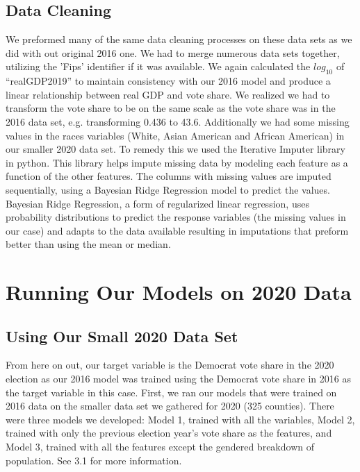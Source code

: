 \documentclass[letterpaper, twocolumn]{article}
\begin{document}
\subsection{Data Cleaning}

We preformed many of the same data cleaning processes on these data sets as we did with out original 2016 one. We had to merge numerous data sets together, utilizing the 'Fips' identifier if it was available. We again calculated the $log_{10}$ of “realGDP2019” to maintain consistency with our 2016 model and produce a linear relationship between real GDP and vote share. We realized we had to transform the vote share to be on the same scale as the vote share was in the 2016 data set, e.g. transforming 0.436 to 43.6. Additionally we had some missing values in the races variables (White, Asian American and African American) in our smaller 2020  data set. To remedy this we used the Iterative Imputer library in python. This library helps impute missing data by modeling each feature as a function of the other features. The columns with missing values are imputed sequentially, using a Bayesian Ridge Regression model to predict the values. Bayesian Ridge Regression, a form of regularized linear regression, uses probability distributions to predict the response variables (the missing values in our case) and adapts to the data available resulting in imputations that preform better than using the mean or median.  



\section{Running Our Models on 2020 Data}

\subsection{Using Our Small 2020 Data Set}

From here on out, our target variable is the Democrat vote share in the 2020 election as our 2016 model was trained using the Democrat vote share in 2016 as the target variable in this case.
First, we ran our models that were trained on 2016 data on the smaller data set we gathered for 2020 (325 counties). There were three models we developed: Model 1, trained with all the variables,  Model 2, trained with only the previous election year's vote share as the features, and Model 3, trained with all the features except the gendered breakdown of population. See 3.1 for more information. 
\end{document}
